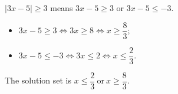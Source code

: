$|3x-5|\ge3$ means $3x-5\ge3$ or $3x-5\le-3$.
\begin{itemize}
\item $3x-5\ge3\iff 3x\ge8\iff x\ge\dfrac{8}{3}$;
\item $3x-5\le-3\iff 3x\le2\iff x\le\dfrac{2}{3}$.
\end{itemize}
The solution set is $\boxed{x\le\dfrac{2}{3}\ \text{or}\ x\ge\dfrac{8}{3}}$.
